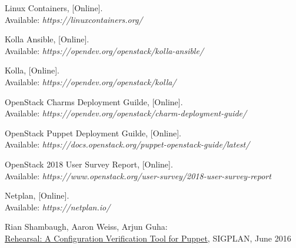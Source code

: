 \documentclass[officiallayout]{tktla}
\begin{document}
\begin{thebibliography}{9}
Linux Containers, [Online]. \\
Available: \textit{https://linuxcontainers.org/}

Kolla Ansible, [Online]. \\
Available: \textit{https://opendev.org/openstack/kolla-ansible/}

Kolla, [Online]. \\
Available: \textit{https://opendev.org/openstack/kolla/}

OpenStack Charms Deployment Guilde, [Online]. \\
Available: \textit{https://opendev.org/openstack/charm-deployment-guide/}

OpenStack Puppet Deployment Guilde, [Online]. \\
Available: \textit{https://docs.openstack.org/puppet-openstack-guide/latest/}

OpenStack 2018 User Survey Report, [Online]. \\
Available: \textit{https://www.openstack.org/user-survey/2018-user-survey-report}

Netplan, [Online]. \\
Available: \textit{https://netplan.io/}

Rian Shambaugh, Aaron Weiss, Arjun Guha:
\\\href{https://dl.acm.org/doi/pdf/10.1145/2908080.2908083}{Rehearsal: A
Configuration Verification Tool for Puppet},
SIGPLAN, June 2016

\end{thebibliography}
\end{document}
